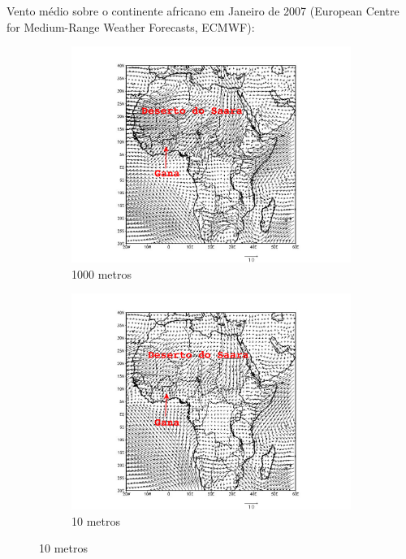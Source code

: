 \begin{frame}
\frametitle{}
Vento médio sobre o continente africano em Janeiro de 2007
(European Centre for Medium-Range Weather Forecasts, ECMWF):
\begin{figure}[H]
\centering
  \begin{subfigure}[b]{0.45\linewidth}
  	\includegraphics[width=1.3\linewidth]{../../inputs/grads/gimp/875hPa/JAN_2008.pdf}
  	\caption{1000 metros}
  \end{subfigure}
  \begin{subfigure}[b]{0.45\linewidth}
    \includegraphics[width=1.3\linewidth]{../../inputs/grads/gimp/1000hPa/JAN_2008.pdf}
    \caption{10 metros}
  \end{subfigure}%
\end{figure}
\end{frame}

